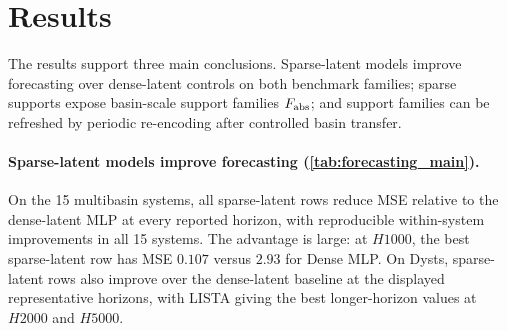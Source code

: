 \documentclass[11pt]{article}
\theoremstyle{plain}
\theoremstyle{definition}
\begin{document}
\section{Results}
\label{sec:results}

The results support three main conclusions. Sparse-latent models improve forecasting over dense-latent controls on both benchmark families; sparse supports expose basin-scale support families \(F_{\rm abs}\); and support families can be refreshed by periodic re-encoding after controlled basin transfer.

\begin{table}[tbp]
\centering
\caption{Forecasting performance on the two benchmark families. Values are MSEs; lower is better. Each cell is an arithmetic mean across systems after summarizing seeds within each system by IQM. Superscripts mark Holm-corrected tests against the dense-latent MLP baseline: multibasin cells use within-system Wilcoxon/Holm tests and Dysts cells use exact sign tests across systems (\(\ast\), \(p<0.05\)). \textbf{Bold} marks the best entry in each column.}
\label{tab:forecasting_main}
\label{tab:dysts_long}
{\setlength{\tabcolsep}{2pt}
\resizebox{\textwidth}{!}{}}
\end{table}

\paragraph{Sparse-latent models improve forecasting (\cref{tab:forecasting_main}).}
On the 15 multibasin systems, all sparse-latent rows reduce MSE relative to the dense-latent MLP at every reported horizon, with reproducible within-system improvements in all 15 systems. The advantage is large: at \(H1000\), the best sparse-latent row has MSE \(0.107\) versus \(2.93\) for Dense MLP. On Dysts, sparse-latent rows also improve over the dense-latent baseline at the displayed representative horizons, with LISTA giving the best longer-horizon values at \(H2000\) and \(H5000\).
\end{document}
